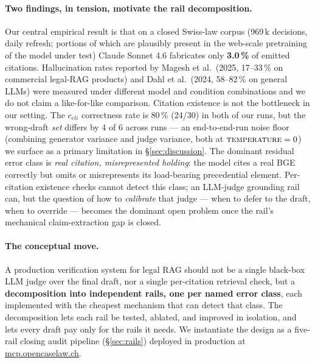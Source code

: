 \documentclass[11pt,a4paper]{article}
\begin{document}
\paragraph{Two findings, in tension, motivate the rail decomposition.}
Our central empirical result is that on a closed Swiss-law corpus
(969\,k decisions, daily refresh; portions of which are
plausibly present in the web-scale pretraining of the model
under test) Claude Sonnet 4.6 fabricates only \textbf{3.0\,\%}
of emitted citations.  Hallucination rates reported by Magesh
et al.\ (2025, 17--33\,\% on commercial legal-RAG products) and
Dahl et al.\ (2024, 58--82\,\% on general LLMs) were measured
under different model and condition combinations and we do not
claim a like-for-like comparison.  Citation existence is not the
bottleneck in our setting.  The $c_{eli}$ correctness rate is
80\,\% (24/30) in both of our runs, but the wrong-draft
\emph{set} differs by 4 of 6 across runs --- an
end-to-end-run noise floor (combining generator variance and
judge variance, both at $\textsc{temperature}=0$) we surface
as a primary limitation in \S\ref{sec:discussion}.  The dominant residual error class is
\emph{real citation, misrepresented holding}: the model cites a
real BGE correctly but omits or misrepresents its load-bearing
precedential element.  Per-citation existence checks cannot
detect this class; an LLM-judge grounding rail can, but the
question of how to \emph{calibrate} that judge --- when to defer
to the draft, when to override --- becomes the dominant open
problem once the rail's mechanical claim-extraction gap is
closed.

\paragraph{The conceptual move.}
A production verification system for legal RAG should not be a
single black-box LLM judge over the final draft, nor a single
per-citation retrieval check, but a \textbf{decomposition into
independent rails, one per named error class}, each implemented with
the cheapest mechanism that can detect that class.  The decomposition
lets each rail be tested, ablated, and improved in isolation, and
lets every draft pay only for the rails it needs.  We instantiate
the design as a five-rail closing audit pipeline
(\S\ref{sec:rails}) deployed in production at
\url{mcp.opencaselaw.ch}.
\end{document}
